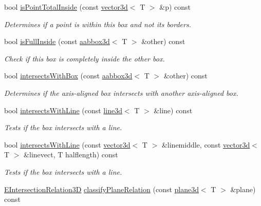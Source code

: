 \begin{DoxyCompactItemize}
bool \hyperlink{classirr_1_1core_1_1aabbox3d_a0be7a03228c7af1e6c563acea4af316e}{is\+Point\+Total\+Inside} (const \hyperlink{classirr_1_1core_1_1vector3d}{vector3d}$<$ T $>$ \&p) const
\begin{DoxyCompactList}\small\item\em Determines if a point is within this box and not its borders. \end{DoxyCompactList}\item 
bool \hyperlink{classirr_1_1core_1_1aabbox3d_a81be1b0ba25d5adff30182ce0f9670ab}{is\+Full\+Inside} (const \hyperlink{classirr_1_1core_1_1aabbox3d}{aabbox3d}$<$ T $>$ \&other) const
\begin{DoxyCompactList}\small\item\em Check if this box is completely inside the \textquotesingle{}other\textquotesingle{} box. \end{DoxyCompactList}\item 
bool \hyperlink{classirr_1_1core_1_1aabbox3d_a7210d8759855896ba4919a800ad69bbc}{intersects\+With\+Box} (const \hyperlink{classirr_1_1core_1_1aabbox3d}{aabbox3d}$<$ T $>$ \&other) const
\begin{DoxyCompactList}\small\item\em Determines if the axis-\/aligned box intersects with another axis-\/aligned box. \end{DoxyCompactList}\item 
bool \hyperlink{classirr_1_1core_1_1aabbox3d_ad0d7fec0145329dfca538066298fa3f2}{intersects\+With\+Line} (const \hyperlink{classirr_1_1core_1_1line3d}{line3d}$<$ T $>$ \&line) const
\begin{DoxyCompactList}\small\item\em Tests if the box intersects with a line. \end{DoxyCompactList}\item 
bool \hyperlink{classirr_1_1core_1_1aabbox3d_ad24417ef24e598bc484ea8b7af1c2187}{intersects\+With\+Line} (const \hyperlink{classirr_1_1core_1_1vector3d}{vector3d}$<$ T $>$ \&linemiddle, const \hyperlink{classirr_1_1core_1_1vector3d}{vector3d}$<$ T $>$ \&linevect, T halflength) const
\begin{DoxyCompactList}\small\item\em Tests if the box intersects with a line. \end{DoxyCompactList}\item 
\hyperlink{namespaceirr_1_1core_a8a9999eb0d151083f48afe5f7d17a96c}{E\+Intersection\+Relation3D} \hyperlink{classirr_1_1core_1_1aabbox3d_aa2a6c5613392e34552a31fe7b46286b1}{classify\+Plane\+Relation} (const \hyperlink{classirr_1_1core_1_1plane3d}{plane3d}$<$ T $>$ \&plane) const

\end{DoxyCompactItemize}
